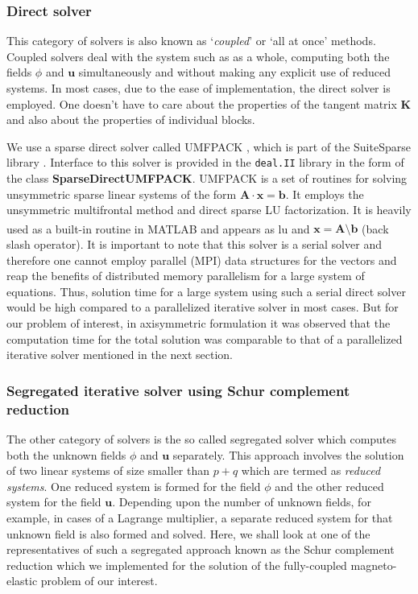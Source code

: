 \documentclass[11pt,a4paper,final]{article}
\begin{document}
\subsubsection{Direct solver}
This category of solvers is also known as `\textit{coupled}' or `all at once' methods. Coupled solvers deal with the system such as  as a whole, computing both the fields $\phi$ and $\mathbf{u}$ simultaneously and without making any explicit use of reduced systems. In most cases, due to the ease of implementation, the direct solver is employed. One doesn't have to care about the properties of the tangent matrix $\mathbf{K}$ and also about the properties of individual blocks. \par 

We use a sparse direct solver called UMFPACK \cite{davis2004algorithm}, which is part of the SuiteSparse library \cite{davis2015suitesparse}. Interface to this solver is provided in the \texttt{deal.II} \cite{Alzetta2018} library in the form of the class \textbf{SparseDirectUMFPACK}. UMFPACK is a set of routines for solving unsymmetric sparse linear systems of the form $\mathbf{A} \cdot \mathbf{x} = \mathbf{b}$. It employs the unsymmetric multifrontal method and direct sparse LU factorization. It is heavily used as a built-in routine in MATLAB\textsuperscript{\tiny\sffamily\textregistered} and appears as lu and $\mathbf{x} = \mathbf{A} \setminus \mathbf{b}$ (back slash operator). It is important to note that this solver is a serial solver and therefore one cannot employ parallel (MPI) data structures for the vectors and reap the benefits of distributed memory parallelism for a large system of equations. Thus, solution time for a large system using such a serial direct solver would be high compared to a parallelized iterative solver in most cases. But for our problem of interest, in axisymmetric formulation it was observed that the computation time for the total solution was comparable to that of a parallelized iterative solver mentioned in the next section.

\subsubsection{Segregated iterative solver using Schur complement reduction}
The other category of solvers is the so called segregated solver which computes both the unknown fields $\phi$ and $\mathbf{u}$ separately. This approach involves the solution of two linear systems of size smaller than $p+q$ which are termed as \textit{reduced systems}. One reduced system is formed for the field $\phi$ and the other reduced system for the field $\mathbf{u}$. Depending upon the number of unknown fields, for example, in cases of a Lagrange multiplier, a separate reduced system for that unknown field is also formed and solved. Here, we shall look at one of the representatives of such a segregated approach known as the Schur complement reduction which we implemented for the solution of the fully-coupled magneto-elastic problem of our interest. \par 
\end{document}
